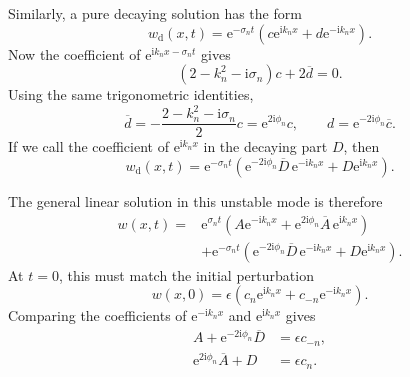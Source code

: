 \documentclass{amsart}
\newcounter{note}
\numberwithin{equation}{hw}
\begin{document}
Similarly, a pure decaying solution has the form
\begin{equation}
w_{\mathrm{d}}(x,t)
=
\mathrm{e}^{-\sigma_nt}
\left(
c\mathrm{e}^{\mathrm{i}k_nx}
+
d\mathrm{e}^{-\mathrm{i}k_nx}
\right).
\label{eq:note1-pure-decaying}
\end{equation}
Now the coefficient of
\(\mathrm{e}^{\mathrm{i}k_nx-\sigma_nt}\) gives
\begin{equation}
\left(2-k_n^2-\mathrm{i}\sigma_n\right)c
+
2\overline{d}
=0.
\label{eq:note1-decaying-eigenvector-equation}
\end{equation}
Using the same trigonometric identities,
\begin{equation}
\overline{d}
=
-\frac{2-k_n^2-\mathrm{i}\sigma_n}{2}c
=
\mathrm{e}^{2\mathrm{i}\phi_n}c,
\qquad
d=\mathrm{e}^{-2\mathrm{i}\phi_n}\overline{c}.
\label{eq:note1-decaying-relation}
\end{equation}
If we call the coefficient of \(\mathrm{e}^{\mathrm{i}k_nx}\) in the
decaying part \(D\), then
\begin{equation}
w_{\mathrm{d}}(x,t)
=
\mathrm{e}^{-\sigma_nt}
\left(
\mathrm{e}^{-2\mathrm{i}\phi_n}\overline{D}\,
\mathrm{e}^{-\mathrm{i}k_nx}
+
D\mathrm{e}^{\mathrm{i}k_nx}
\right).
\label{eq:note1-decaying-D-form}
\end{equation}

The general linear solution in this unstable mode is therefore
\begin{align}
w(x,t)
={}&
\mathrm{e}^{\sigma_nt}
\left(
A\mathrm{e}^{-\mathrm{i}k_nx}
+
\mathrm{e}^{2\mathrm{i}\phi_n}\overline{A}\,
\mathrm{e}^{\mathrm{i}k_nx}
\right)
\nonumber\\
&+
\mathrm{e}^{-\sigma_nt}
\left(
\mathrm{e}^{-2\mathrm{i}\phi_n}\overline{D}\,
\mathrm{e}^{-\mathrm{i}k_nx}
+
D\mathrm{e}^{\mathrm{i}k_nx}
\right).
\label{eq:note1-AD-linear-solution}
\end{align}
At \(t=0\), this must match the initial perturbation
\begin{equation}
w(x,0)
=
\epsilon
\left(
c_n\mathrm{e}^{\mathrm{i}k_nx}
+
c_{-n}\mathrm{e}^{-\mathrm{i}k_nx}
\right).
\label{eq:note1-initial-w}
\end{equation}
Comparing the coefficients of
\(\mathrm{e}^{-\mathrm{i}k_nx}\) and
\(\mathrm{e}^{\mathrm{i}k_nx}\) gives
\begin{align}
A+\mathrm{e}^{-2\mathrm{i}\phi_n}\overline{D}
&=
\epsilon c_{-n},
\label{eq:note1-AD-system-minus}
\\
\mathrm{e}^{2\mathrm{i}\phi_n}\overline{A}+D
&=
\epsilon c_n.
\label{eq:note1-AD-system-plus}
\end{align}
\end{document}
